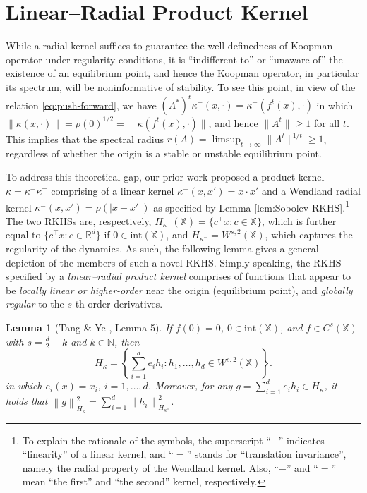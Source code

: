 \documentclass[english]{cccconf}
\renewcommand{\emph}[1]{\textit{#1}}
\newtheorem{lemma}{Lemma}
\newcommand{\mr}[1]{\mathrm{#1}}
\newcommand{\mbb}[1]{\mathds{#1}} %
\newcommand{\mR}{\mbb{R}}
\newcommand{\mX}{\mbb{X}}
\newcommand{\BRA}[1]{\left\{ #1 \right\}}
\newcommand{\norm}[1]{\left\| #1 \right\|}
\begin{document}
\section{Linear--Radial Product Kernel}\label{sec:kernel}
While a radial kernel suffices to guarantee the well-definedness of Koopman operator under regularity conditions, it is ``indifferent to'' or ``unaware of'' the existence of an equilibrium point, and hence the Koopman operator, in particular its spectrum, will be noninformative of stability. 
To see this point, in view of the relation \eqref{eq:push-forward}, we have $(A^*)^t\kappa^=(x, \cdot) = \kappa^=(f^t(x), \cdot)$ in which $\|\kappa(x, \cdot)\| = \rho(0)^{1/2} = \|\kappa(f^t(x), \cdot)\|$, and hence $\|A^t\|\geq 1$ for all $t$. This implies that the spectral radius $r(A) = \limsup_{t\rightarrow \infty}\|A^t\|^{1/t}\geq 1$, regardless of whether the origin is a stable or unstable equilibrium point. 

\par To address this theoretical gap, our prior work \cite{tang-ye-2025-l4dc} proposed a product kernel $\kappa = \kappa^-\kappa^=$ comprising of a linear kernel $\kappa^-(x,x') = x\cdot x'$ and a Wendland radial kernel $\kappa^=(x,x') = \rho(|x-x'|)$ as specified by Lemma \ref{lem:Sobolev-RKHS}.\footnote{To explain the rationale of the symbols, the superscript ``$-$'' indicates ``linearity'' of a linear kernel, and ``$=$'' stands for ``translation invariance'', namely the radial property of the Wendland kernel. Also, ``$-$'' and ``$=$'' mean ``the first'' and ``the second'' kernel, respectively.} 
The two RKHSs are, respectively, $H_{\kappa^-}(\mX) = \{c^\top x: c\in \mX\}$, which is further equal to $\{c^\top x: c\in \mR^d\}$ if $0\in \mr{int}(\mX)$, and $H_{\kappa^=} = W^{s,2}(\mX)$, which captures the regularity of the dynamics. 
As such, the following lemma gives a general depiction of the members of such a novel RKHS. 
Simply speaking, the RKHS specified by a \emph{linear--radial product kernel} comprises of functions that appear to be \emph{locally linear or higher-order} near the origin (equilibrium point), and \emph{globally regular} to the $s$-th-order derivatives. 
\begin{lemma}[Tang \& Ye \cite{tang-ye-2025-l4dc}, Lemma 5]
\label{lem:member}
    If $f(0)=0$, $0\in \mr{int}(\mbb{X})$, and $f\in C^s(\mbb{X})$ with $s=\frac{d}{2}+k$ and $k\in \mbb{N}$, then
    \begin{equation}\label{eq:member}
    \textstyle
        H_\kappa = \BRA{\sum_{i=1}^d e_ih_i: h_1,\dots,h_d\in W^{s,2}(\mbb{X})}.
    \end{equation}
    in which $e_i(x) = x_i$, $i=1,\dots,d$. Moreover, for any $g = \sum_{i=1}^d e_ih_i \in H_\kappa$, it holds that
    $ \norm{g}_{H_\kappa}^2 = \sum_{i=1}^d \norm{h_i}_{H_{\kappa^=}}^2 $.
\end{lemma}
\end{document}
